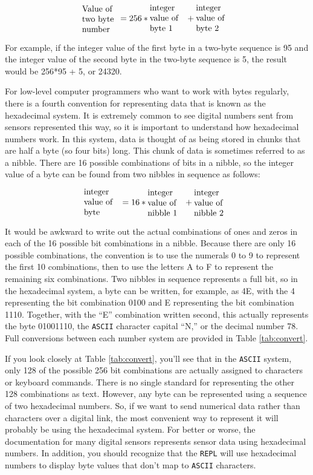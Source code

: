 \begin{equation}
\label{eq:base256}
\text{\parbox[c]{1.5cm}{\raggedright Value of two byte number}} = 256 *\text{\parbox[c]{1.5cm}{\raggedright integer value of byte 1}} + \text{\parbox[c]{1.5cm}{\raggedright integer value of byte 2}} 
\end{equation}

For example, if the integer value of the first byte in a two-byte sequence is 95 and the integer value of the second byte in the two-byte sequence is 5, the result would be 256*95 + 5, or 24320.

For low-level computer programmers who want to work with bytes regularly, there is a fourth convention for representing data that is known as the hexadecimal system.
It is extremely common to see digital numbers sent from sensors represented this way, so it is important to understand how hexadecimal numbers work.
In this system, data is thought of as being stored in chunks that are half a byte (so four bits) long.
This chunk of data is sometimes referred to as a nibble.
There are 16 possible combinations of bits in a nibble, so the integer value of a byte can be found from two nibbles in sequence as follows:

\begin{equation}
\label{eq:base16}
\text{\parbox[c]{1.5cm}{\raggedright integer value of byte}} = 16 *\text{\parbox[c]{1.5cm}{\raggedright integer value of nibble 1}} + \text{\parbox[c]{1.5cm}{\raggedright integer value of nibble 2}} 
\end{equation}

It would be awkward to write out the actual combinations of ones and zeros in each of the 16 possible bit combinations in a nibble.
Because there are only 16 possible combinations, the convention is to use the numerals 0 to 9 to represent the first 10 combinations, then to use the letters A to F to represent the remaining six combinations.
Two nibbles in sequence represents a full bit, so in the hexadecimal system, a byte can be written, for example, as 4E, with the 4 representing the bit combination 0100 and E representing the bit combination 1110.
Together, with the “E” combination written second, this actually represents the byte 01001110, the \texttt{ASCII} character capital “N,” or the decimal number 78.
Full conversions between each number system are provided in Table \ref{tab:convert}.  

If you look closely at Table \ref{tab:convert}, you’ll see that in the \texttt{ASCII} system, only 128 of the possible 256 bit combinations are actually assigned to characters or keyboard commands.
There is no single standard for representing the other 128 combinations as text.  
However, any byte can be represented using a sequence of two hexadecimal numbers.
So, if we want to send numerical data rather than characters over a digital link, the most convenient way to represent it will probably be using the hexadecimal system.
For better or worse, the documentation for many digital sensors represents sensor data using hexadecimal numbers.
In addition, you should recognize that the \Micropython \texttt{REPL} will use hexadecimal numbers to display byte values that don’t map to \texttt{ASCII} characters.

